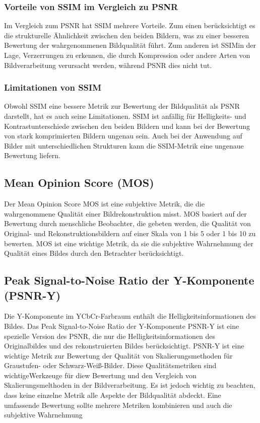         \subsubsection{Vorteile von SSIM im Vergleich zu PSNR}
        
            Im Vergleich zum PSNR hat SSIM mehrere Vorteile. Zum einen berücksichtigt es die strukturelle Ähnlichkeit zwischen den beiden Bildern, was zu einer besseren Bewertung der wahrgenommenen Bildqualität führt. 
            Zum anderen ist SSIMin der Lage, Verzerrungen zu erkennen, die durch Kompression oder andere Arten von Bildverarbeitung verursacht werden, während PSNR dies nicht tut.
        \subsubsection{Limitationen von SSIM}
        
            Obwohl SSIM eine bessere Metrik zur Bewertung der Bildqualität als PSNR darstellt, hat es auch seine Limitationen. 
            SSIM ist anfällig für Helligkeits- und Kontrastunterschiede zwischen den beiden Bildern und kann bei der Bewertung von stark komprimierten Bildern ungenau sein. 
            Auch bei der Anwendung auf Bilder mit unterschiedlichen Strukturen kann die SSIM-Metrik eine ungenaue Bewertung liefern.
    \subsection{Mean Opinion Score (MOS)}
        Der Mean Opinion Score \ac{MOS} ist eine subjektive Metrik, die die wahrgenommene Qualität einer Bildrekonstruktion misst.
        MOS basiert auf der Bewertung durch menschliche Beobachter, die gebeten werden, die Qualität von Original- und Rekonstruktionsbildern auf einer Skala von 1 bis 5 oder 1 bis 10 zu bewerten.
        MOS ist eine wichtige Metrik, da sie die subjektive Wahrnehmung der Qualität eines Bildes durch den Betrachter berücksichtigt.
    \subsection{Peak Signal-to-Noise Ratio der Y-Komponente (PSNR-Y)}
        Die Y-Komponente im YCbCr-Farbraum enthält die Helligkeitsinformationen des Bildes. 
        Das Peak Signal-to-Noise Ratio der Y-Komponente \ac{PSNR-Y} ist eine spezielle Version des PSNR, die nur die Helligkeitsinformationen des Originalbildes und des rekonstruierten Bildes berücksichtigt. 
        PSNR-Y ist eine wichtige Metrik zur Bewertung der Qualität von Skalierungsmethoden für Graustufen- oder Schwarz-Weiß-Bilder.        
        Diese Qualitätsmetriken sind wichtigeWerkzeuge für diew Bewertung und den Vergleich von Skalierungsmelthoden in der Bildverarbeitung.
        Es ist jedoch wichtig zu beachten, dass keine einzelne Metrik alle Aspekte der Bildqualität abdeckt. Eine umfassende Bewertung sollte mehrere Metriken kombinieren und auch die subjektive Wahrnehmung %
